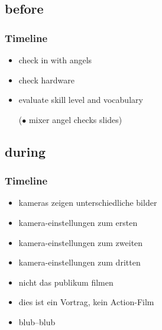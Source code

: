 \documentclass[hyperref={pdfpagelabels=false}]{beamer}
\begin{document}
\subsection{before}
\begin{frame}
\frametitle{Timeline}
\begin{itemize}[<+->]
\item check in with angels %
\item check hardware %
\item evaluate skill level and vocabulary %
\item [($\bullet$ ] mixer angel checks slides) %
\end{itemize} 
\end{frame}


\subsection{during}
\begin{frame}
\frametitle{Timeline}
\begin{itemize}
\item  kameras zeigen unterschiedliche bilder 
\item  kamera-einstellungen zum ersten
\item  kamera-einstellungen zum zweiten
\item  kamera-einstellungen zum dritten
\item  nicht das publikum filmen
\item  dies ist ein Vortrag, kein Action-Film 
\item  blub--blub
\end{itemize} 
\end{frame}
\end{document}
